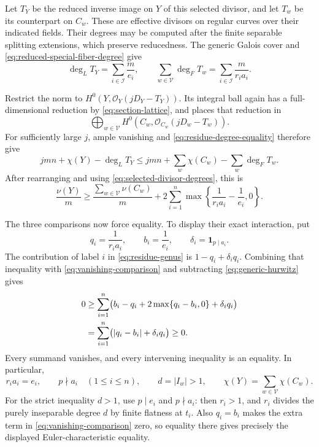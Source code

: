 Let $T_Y$ be the reduced inverse image on $Y$ of this selected divisor,
and let $T_w$ be its counterpart on $C_w$. These are effective divisors
on regular curves over their indicated fields. Their degrees may be
computed after the finite separable splitting extensions, which preserve
reducedness. The generic Galois cover and
\eqref{eq:reduced-special-fiber-degree} give
\begin{equation}\label{eq:selected-divisor-degrees}
 \deg_L T_Y=\sum_{i\in\mathcal I}\frac m{e_i},\qquad
 \sum_{w\in\mathcal V}\deg_F T_w
    =\sum_{i\in\mathcal I}\frac m{r_i a_i}.
\end{equation}

Restrict the norm to
$H^0(Y,\mathcal O_Y(jD_Y-T_Y))$. Its integral ball again has a
full-dimensional reduction by \eqref{eq:section-lattice}, and
 places that reduction in
\[
 \bigoplus_{w\in\mathcal V}
 H^0(C_w,\mathcal O_{C_w}(jD_w-T_w)).
\]
For sufficiently large $j$, ample vanishing and
\eqref{eq:residue-degree-equality} therefore give
\[
 jmn+\chi(Y)-\deg_L T_Y
 \leq jmn+\sum_w\chi(C_w)-\sum_w\deg_F T_w.
\]
After rearranging and using \eqref{eq:selected-divisor-degrees}, this is
\begin{equation}\label{eq:vanishing-comparison}
 \frac{\nu(Y)}m
 \geq \frac{\sum_{w\in\mathcal V}\nu(C_w)}m
 +2\sum_{i=1}^n
   \max\left\{\frac1{r_i a_i}-\frac1{e_i},0\right\}.
\end{equation}

The three comparisons now force equality. To display their exact
interaction, put
\[
 q_i=\frac1{r_i a_i},\qquad b_i=\frac1{e_i},\qquad
 \delta_i=\mathbf 1_{p\mid a_i}.
\]
The contribution of label $i$ in \eqref{eq:residue-genus} is
$1-q_i+\delta_iq_i$. Combining that inequality with
\eqref{eq:vanishing-comparison} and subtracting
\eqref{eq:generic-hurwitz} gives
\begin{align}
 0
 &\geq \sum_{i=1}^n
       \bigl(b_i-q_i+2\max\{q_i-b_i,0\}+\delta_iq_i\bigr)
       \notag\\
 &=\sum_{i=1}^n\bigl(|q_i-b_i|+\delta_iq_i\bigr)
 \geq0.\label{eq:genus-nonnegative-excess}
\end{align}
Every summand vanishes, and every intervening inequality is an equality.
In particular,
\begin{equation}\label{eq:sharp-specialization}
 r_i a_i=e_i,\qquad p\nmid a_i\quad(1\leq i\leq n),
 \qquad d=|I_w|>1,
 \qquad \chi(Y)=\sum_{w\in\mathcal V}\chi(C_w).
\end{equation}
For the strict inequality $d>1$, use $p\mid e_i$ and $p\nmid a_i$:
then $r_i>1$, and $r_i$ divides the purely inseparable degree $d$ by
finite flatness at $t_i$. Also $q_i=b_i$ makes the extra term in
\eqref{eq:vanishing-comparison} zero, so equality there gives precisely
the displayed Euler-characteristic equality.

